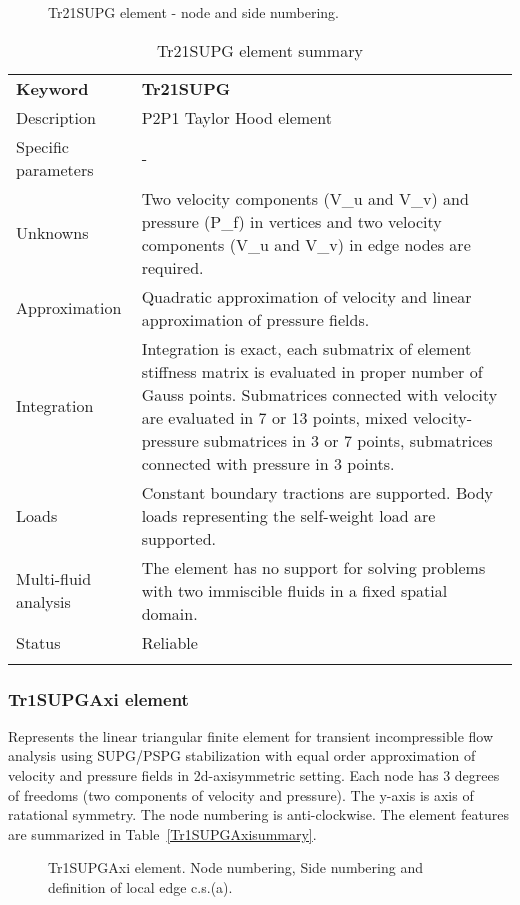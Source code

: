 \documentclass[a4paper]{article}
\newcommand{\templabel}{}%
\newcommand{\tempcaption}{}%
\newcounter{nelpar}
\newenvironment{elementsummary}[5]{%
  \gdef\tempcaption{#4}%
  \gdef\templabel{#5}%
  \setcounter{nelpar}{0}%
  \begin{center} %
    \begin{table}[!htb] %
      \begin{tabular}{|l|p{9cm}|}\hline %
        {\bf Keyword} & \bf{#1}\\ %
        {Description} & {#2}\\ %
        {Specific parameters} & {#3}\\ \hline %
}{
  \\ \hline %
      \end{tabular}%
      \caption{\tempcaption}%
      \label{\templabel}%
    \end{table}%
  \end{center}%
}
\newcommand{\elementDescription}[2]{{#1} & {#2}\\ }
\begin{document}
\begin{figure}[htb]
 \centering
 \begin{makeimage}
  
 \end{makeimage}
 \caption{Tr21SUPG element - node and side numbering.}
 \label{Tr21SUPGfig}
\end{figure}

\begin{elementsummary}{Tr21SUPG}{P2P1 Taylor Hood element}{-}{Tr21SUPG element summary}{Tr21SUPGsummary}
\elementDescription{Unknowns}{Two velocity components (V\_u and V\_v) and pressure (P\_f) in vertices and two velocity components (V\_u and V\_v) in edge nodes are required.}
\elementDescription{Approximation}{Quadratic approximation of velocity and linear approximation of pressure fields.}
\elementDescription{Integration}{Integration is exact, each submatrix of element stiffness matrix is evaluated in proper number of
Gauss points. Submatrices connected with velocity are evaluated in 7 or 13 points, mixed velocity-pressure
submatrices in 3 or 7 points, submatrices connected with pressure in 3 points.}
\elementDescription{Loads}{Constant boundary tractions are supported. Body loads
representing the self-weight load are supported.}
\elementDescription{Multi-fluid analysis}{The element has no support for solving
problems with two immiscible fluids in a fixed spatial domain.}
\elementDescription{Status}{Reliable}
\end{elementsummary}


\subsubsection{Tr1SUPGAxi element}
\label{Tr1SUPGAxi}
Represents the linear triangular finite element for transient
incompressible flow analysis using SUPG/PSPG stabilization with equal order
approximation of velocity and pressure fields in 2d-axisymmetric setting. Each node has 3 degrees
of freedoms (two components of velocity and pressure). The y-axis is
axis of ratational symmetry. The node numbering is anti-clockwise. The element features are summarized in Table~\ref{Tr1SUPGAxisummary}.

\begin{figure}[htb]
 \centering
 \begin{makeimage}
  
 \end{makeimage}
 \caption{Tr1SUPGAxi element. Node numbering, Side numbering and
 definition of local edge c.s.(a).}
 \label{Tr1SUPGAxifig}
\end{figure}
\end{document}
